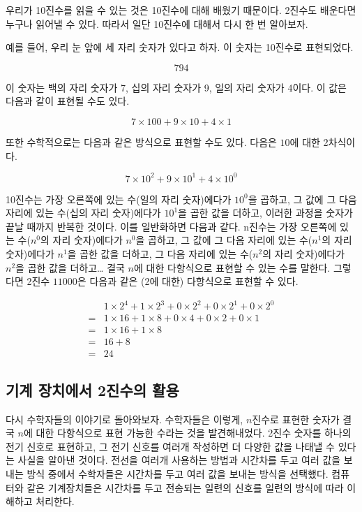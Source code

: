 \documentclass{article}
\begin{document}
우리가 10진수를 읽을 수 있는 것은 10진수에 대해 배웠기 때문이다. 2진수도 배운다면
누구나 읽어낼 수 있다. 따라서 일단 10진수에 대해서 다시 한 번 알아보자.

예를 들어, 우리 눈 앞에 세 자리 숫자가 있다고 하자. 이 숫자는 10진수로 표현되었다.

$$
794
$$

이 숫자는 백의 자리 숫자가 7, 십의 자리 숫자가 9, 일의 자리 숫자가 4이다.
이 값은 다음과 같이 표현될 수도 있다.

$$
7 \times 100 + 9 \times 10 + 4 \times 1
$$

또한 수학적으로는 다음과 같은 방식으로 표현할 수도 있다. 다음은 $10$에 대한
2차식이다.

$$
7 \times 10^2 + 9 \times 10^1 + 4 \times 10^0
$$

10진수는 가장 오른쪽에 있는 수(일의 자리 숫자)에다가 $10^0$을 곱하고, 그 값에
그 다음 자리에 있는 수(십의 자리 숫자)에다가 $10^1$을 곱한 값을 더하고,
이러한 과정을 숫자가 끝날 때까지 반복한 것이다. 이를 일반화하면 다음과 같다.
n진수는 가장 오른쪽에 있는 수($n^0$의 자리 숫자)에다가 $n^0$을 곱하고, 그 값에
그 다음 자리에 있는 수($n^1$의 자리 숫자)에다가 $n^1$을 곱한 값을 더하고,
그 다음 자리에 있는 수($n^2$의 자리 숫자)에다가 $n^2$을 곱한 값을 더하고\dots
결국 $n$에 대한 다항식으로 표현할 수 있는 수를 말한다.
그렇다면 2진수 $11000$은 다음과 같은 (2에 대한) 다항식으로 표현할 수 있다.

$$
\begin{aligned}
     & 1 \times 2^4 + 1 \times 2^3 + 0 \times 2^2 + 0 \times 2^1 + 0 \times 2^0 \\
    =& 1 \times 16 + 1 \times 8 + 0 \times 4 + 0 \times 2 + 0 \times 1 \\
    =& 1 \times 16 + 1 \times 8 \\
    =& 16 + 8 \\
    =& 24
\end{aligned}
$$

\subsection{기계 장치에서 2진수의 활용}

다시 수학자들의 이야기로 돌아와보자. 수학자들은 이렇게, $n$진수로 표현한 숫자가 결국
$n$에 대한 다항식으로 표현 가능한 수라는 것을 발견해내었다. 2진수 숫자를 하나의
전기 신호로 표현하고, 그 전기 신호를 여러개 작성하면 더 다양한 값을 나태낼 수 있다는
사실을 알아낸 것이다. 전선을 여러개 사용하는 방법과 시간차를 두고 여러 값을 보내는
방식 중에서 수학자들은 시간차를 두고 여러 값을 보내는 방식을 선택했다. 컴퓨터와 같은
기계장치들은 시간차를 두고 전송되는 일련의 신호를 일련의 방식에 따라 이해하고 처리한다.
\end{document}
